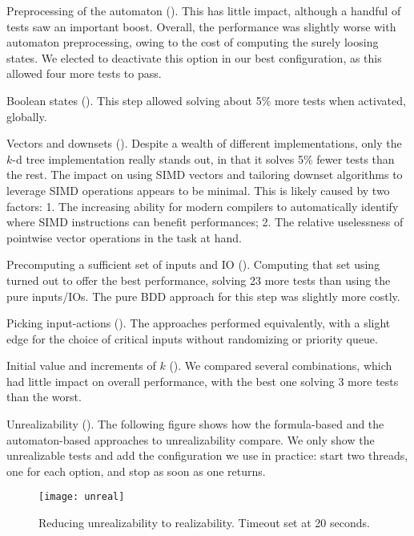 \documentclass[runningheads,a4paper]{llncs}
\begin{document}
\begin{compactitem}
\item Preprocessing of the automaton ().  This has little
  impact, although a handful of tests saw an important boost.  Overall, the
  performance was slightly worse with automaton preprocessing, owing to the cost
  of computing the surely loosing states.  We elected to deactivate this option
  in our best configuration, as this allowed four more tests to pass.
\item Boolean states ().  This step allowed solving about
  5\% more tests when activated, globally.  
\item Vectors and downsets ().  Despite a wealth of different
  implementations, only the \(k\)-d tree implementation really stands out, in that
  it solves 5\% fewer tests than the rest.  The impact on using SIMD vectors and
  tailoring downset algorithms to leverage SIMD operations appears to be
  minimal.  This is likely caused by two factors: 1. The increasing ability for
  modern compilers to automatically identify where SIMD instructions can benefit
  performances; 2. The relative uselessness of pointwise vector operations in
  the task at hand.
\item Precomputing a sufficient set of inputs and IO ().
  Computing that set using  turned out to offer the best
  performance, solving 23 more tests than using the pure inputs/IOs.  The
  pure BDD approach for this step was slightly more costly.
\item Picking input-actions ().  The approaches performed
  equivalently, with a slight edge for the choice of critical inputs without
  randomizing or priority queue.
\item Initial value and increments of \(k\) ().  We compared several
  combinations, which had little impact on overall performance, with the best
  one solving 3 more tests than the worst.
\item Unrealizability (). The following figure shows how the
  formula-based and the automaton-based approaches to unrealizability compare.
  We only show the unrealizable tests and add the configuration we use in
  practice: start two threads, one for each option, and stop as soon as one
  returns.
  \begin{figure}[h!]
    \centering\vspace{-2em}
    \texttt{[image: unreal]}\vspace{-1em}
    \caption{Reducing unrealizability to realizability.  Timeout set at 20
      seconds.}
    \label{fig:unreal}
  \end{figure}


\end{compactitem}
\end{document}
